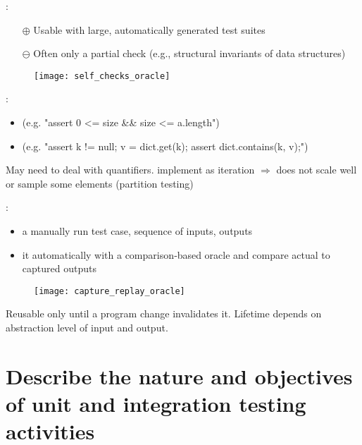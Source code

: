  :

\begin{minipage}{0.58\textwidth}
    \begin{itemize}
        \item [$\oplus$]Usable with large, automatically generated test suites
        \item [$\ominus$]Often only a partial check (e.g., structural invariants of data structures)
    \end{itemize}
\end{minipage}
\hfill
\begin{minipage}{0.40\textwidth}
    \begin{figure}[H]
        \centering
        \texttt{[image: self\_checks\_oracle]}
    \end{figure}
\end{minipage}
    
 :
\begin{itemize}
    \item {} (e.g. "assert 0 <= size \&\& size <= a.length")
    \item {} (e.g. "assert k != null; v = dict.get(k); assert dict.contains(k, v);")
\end{itemize}
May need to deal with quantifiers. implement as iteration $\Rightarrow$ does not scale well or sample some elements (partition testing)
    
 :
\begin{itemize}
    \item {} a manually run test case, sequence of inputs, outputs
    \item {} it automatically with a comparison‐based oracle and compare actual to captured outputs
\end{itemize}
\begin{figure}[H]
    \centering
    \texttt{[image: capture\_replay\_oracle]}
\end{figure}

Reusable only until a program change invalidates it. Lifetime depends on abstraction level of input and output.

\section{Describe the nature and objectives of unit and integration testing activities}

